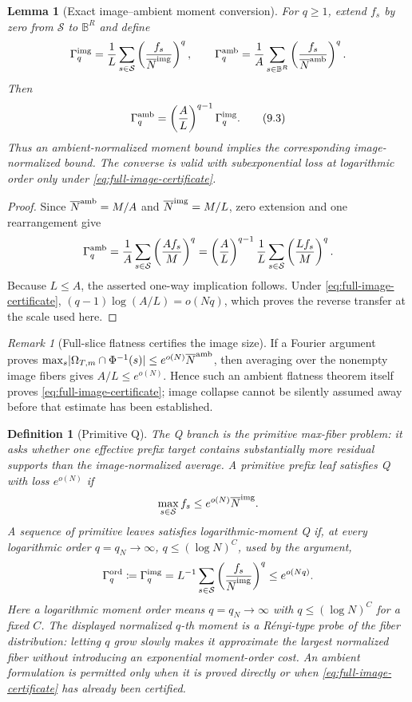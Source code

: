 \documentclass[12pt,a4paper]{amsart}
\numberwithin{equation}{section}
\newtheorem{lemma}[lemma]{Lemma}
\newtheorem{definition}[definition]{Definition}
\theoremstyle{remark}
\newtheorem{remark}[remark]{Remark}
\newcommand{\B}{\mathbb B}
\newcommand{\Scal}{\mathcal S}
\newcommand{\Gord}{\Gamma^{\rm ord}}
\newcommand{\barN}{\overline N}
\newcommand{\abs}[1]{\lvert #1\rvert}
\newcommand{\defeq}{\coloneqq}
\begin{document}
\begin{lemma}[Exact image--ambient moment conversion]
\label{lem:image-ambient-moment-conversion}
For \(q\ge1\), extend \(f_s\) by zero from \(\Scal\) to \(\B^R\) and
define
\[
 \Gamma_q^{\rm img}=\frac1L\sum_{s\in\Scal}
       \left(\frac{f_s}{\barN^{\rm img}}\right)^q,
 \qquad
 \Gamma_q^{\rm amb}=\frac1A\sum_{s\in\B^R}
       \left(\frac{f_s}{\barN^{\rm amb}}\right)^q.
\]
Then
\[
 \Gamma_q^{\rm amb}
   =\left(\frac{A}{L}\right)^{q-1}\Gamma_q^{\rm img}.
 \tag{9.3}\label{eq:image-ambient-moment-identity}
\]
Thus an ambient-normalized moment bound implies the corresponding
image-normalized bound.  The converse is valid with subexponential loss at
logarithmic order only under \eqref{eq:full-image-certificate}.
\end{lemma}

\begin{proof}
Since \(\barN^{\rm amb}=M/A\) and \(\barN^{\rm img}=M/L\), zero extension
and one rearrangement give
\[
 \Gamma_q^{\rm amb}
 =\frac1A\sum_{s\in\Scal}\left(\frac{Af_s}{M}\right)^q
 =\left(\frac AL\right)^{q-1}
   \frac1L\sum_{s\in\Scal}\left(\frac{Lf_s}{M}\right)^q.
\]
Because \(L\le A\), the asserted one-way implication follows.  Under
\eqref{eq:full-image-certificate},
\((q-1)\log(A/L)=o(Nq)\), which proves the reverse transfer at the scale
used here.
\end{proof}

\begin{remark}[Full-slice flatness certifies the image size]
\label{rem:flatness-certifies-image}
If a Fourier argument proves
\(\max_s\abs{\Omega_{T,m}\cap\Phi^{-1}(s)}
 \le e^{o(N)}\barN^{\rm amb}\), then averaging over the nonempty image
fibers gives \(A/L\le e^{o(N)}\).  Hence such an ambient flatness theorem
itself proves \eqref{eq:full-image-certificate}; image collapse cannot be
silently assumed away before that estimate has been established.
\end{remark}

\begin{definition}[Primitive Q]\label{def:primitive-q}
The \emph{Q branch} is the primitive max-fiber problem: it asks whether one
effective prefix target contains substantially more residual supports than
the image-normalized average.  A primitive prefix leaf satisfies Q with
loss \(e^{o(N)}\) if
\[
        \max_{s\in\Scal}f_s\le e^{o(N)}\barN^{\rm img}.
\]
A sequence of primitive leaves satisfies logarithmic-moment Q if, at every
logarithmic order \(q=q_N\to\infty\), \(q\le(\log N)^C\), used by the
argument,
\[
 \Gord_q\defeq\Gamma_q^{\rm img}
 =L^{-1}\sum_{s\in\Scal}
       \left(\frac{f_s}{\barN^{\rm img}}\right)^q
 \le e^{o(Nq)}.
\]
Here a \emph{logarithmic moment order} means
\(q=q_N\to\infty\) with \(q\le(\log N)^C\) for a fixed \(C\).  The
displayed normalized \(q\)-th moment is a R\'enyi-type probe of the fiber
distribution: letting \(q\) grow slowly makes it approximate the largest
normalized fiber without introducing an exponential moment-order cost.
An ambient formulation is permitted only when it is proved directly or
when \eqref{eq:full-image-certificate} has already been certified.
\end{definition}
\end{document}

